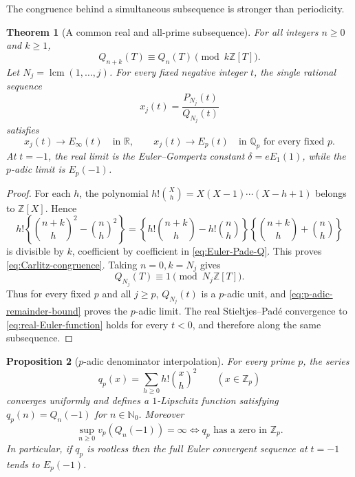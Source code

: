 \documentclass[11pt]{article}
\theoremstyle{keio}
\newtheorem{theorem}{Theorem}[section]
\newtheorem{proposition}[theorem]{Proposition}
\theoremstyle{definition}
\theoremstyle{remark}
\newcommand{\Q}{\mathbb Q}
\newcommand{\R}{\mathbb R}
\newcommand{\N}{\mathbb N}
\newcommand{\Z}{\mathbb Z}
\newcommand{\lcm}{\operatorname{lcm}}
\begin{document}
The congruence behind a simultaneous subsequence is stronger than periodicity.

\begin{theorem}[A common real and all-prime subsequence]
\label{thm:common-placewise-subsequence}
For all integers \(n\ge0\) and \(k\ge1\),
\begin{equation}\label{eq:Carlitz-congruence}
 Q_{n+k}(T)\equiv Q_n(T)\pmod{k\Z[T]}.
\end{equation}
Let \(N_j=\lcm(1,\ldots,j)\).  For every fixed negative integer \(t\), the
single rational sequence
\begin{equation}\label{eq:common-rational-sequence}
 x_j(t)=\frac{P_{N_j}(t)}{Q_{N_j}(t)}
\end{equation}
satisfies
\begin{equation}\label{eq:common-placewise-limits}
 \boxed{\displaystyle
 x_j(t)\longrightarrow E_\infty(t)\quad\text{in }\R,
 \qquad
 x_j(t)\longrightarrow E_p(t)\quad\text{in }\Q_p
 \text{ for every fixed }p.}
\end{equation}
At \(t=-1\), the real limit is the Euler--Gompertz constant
\(\delta=eE_1(1)\), while the \(p\)-adic limit is \(E_p(-1)\).
\end{theorem}

\begin{proof}
For each \(h\), the polynomial
\(h!\binom Xh=X(X-1)\cdots(X-h+1)\) belongs to \(\Z[X]\).  Hence
\[
 h!\left\{\binom{n+k}h^2-\binom nh^2\right\}
 =\left\{h!\binom{n+k}h-h!\binom nh\right\}
  \left\{\binom{n+k}h+\binom nh\right\}
\]
is divisible by \(k\), coefficient by coefficient in
\eqref{eq:Euler-Pade-Q}.  This proves \eqref{eq:Carlitz-congruence}.
Taking \(n=0,k=N_j\) gives
\begin{equation}\label{eq:QN-unit-all-p}
 Q_{N_j}(T)\equiv1\pmod{N_j\Z[T]}.
\end{equation}
Thus for every fixed \(p\) and all \(j\ge p\), \(Q_{N_j}(t)\) is a
\(p\)-adic unit, and \eqref{eq:p-adic-remainder-bound} proves the \(p\)-adic
limit.  The real Stieltjes--Pad\'e convergence to
\eqref{eq:real-Euler-function} holds for every \(t<0\), and therefore along
the same subsequence.
\end{proof}

\begin{proposition}[\(p\)-adic denominator interpolation]
\label{prop:p-adic-denominator-interpolation}
For every prime \(p\), the series
\begin{equation}\label{eq:q-p-interpolation}
 q_p(x)=\sum_{h\ge0}h!\binom xh^2\qquad(x\in\Z_p)
\end{equation}
converges uniformly and defines a \(1\)-Lipschitz function satisfying
\(q_p(n)=Q_n(-1)\) for \(n\in\N_0\).  Moreover
\begin{equation}\label{eq:q-p-root-criterion}
 \boxed{\displaystyle
 \sup_{n\ge0}v_p(Q_n(-1))=\infty
 \Longleftrightarrow q_p\text{ has a zero in }\Z_p.}
\end{equation}
In particular, if \(q_p\) is rootless then the full Euler convergent
sequence at \(t=-1\) tends to \(E_p(-1)\).
\end{proposition}
\end{document}
